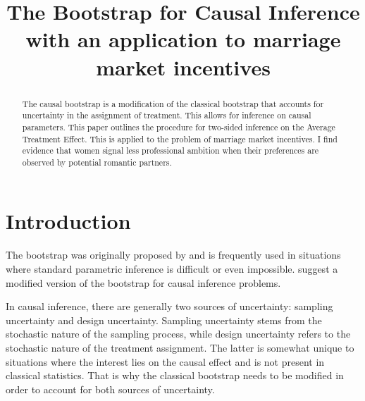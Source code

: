 \documentclass[aodsor,preprint]{imsart}
\numberwithin{equation}{section}
\theoremstyle{plain}
\begin{document}
\begin{frontmatter}
\title{The Bootstrap for Causal Inference with an application to marriage market incentives}

\begin{aug}
\author{ }





\end{aug}

\begin{abstract}
The causal bootstrap is a modification of the classical bootstrap that accounts for uncertainty in the assignment of treatment. This allows for inference on causal parameters. This paper outlines the procedure for two-sided inference on the Average Treatment Effect.
This is applied to the problem of marriage market incentives. I find evidence that women signal less professional ambition when their preferences are observed by potential romantic partners.
\end{abstract}

\begin{keyword}[class=MSC]
\end{keyword}

\begin{keyword}
\end{keyword}

\end{frontmatter}

\section{Introduction}



The bootstrap was originally proposed by \cite{Efron_1982} and is frequently used in situations where standard parametric inference is difficult or even impossible. \cite{Imbens_2021} suggest a modified version of the bootstrap for causal inference problems.

In causal inference, there are generally two sources of uncertainty: sampling uncertainty and design uncertainty. Sampling uncertainty stems from the stochastic nature of the sampling process, while design uncertainty refers to the stochastic nature of the treatment assignment. The latter is somewhat unique to situations where the interest lies on the causal effect and is not present in classical statistics. That is why the classical bootstrap needs to be modified in order to account for both sources of uncertainty.
\end{document}
